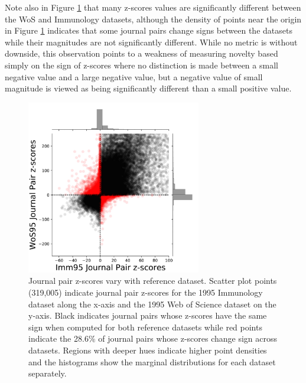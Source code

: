 \documentclass[NETN]{stjour}
\begin{document}
Note also in Figure \ref{fig:scatter} that many z-scores values are significantly different between the WoS and Immunology datasets, although the density of points near the origin in Figure \ref{fig:scatter} indicates that some journal pairs change signs between the datasets while their magnitudes are not significantly different. While no metric is without downside, this observation points to a weakness of measuring novelty based simply on the sign of z-scores where no distinction is made between a small negative value and a large negative value, but a negative value of small magnitude is viewed as being significantly different than a small positive value.


\begin{figure}%
\centering
\includegraphics[width=3in]{fig2_scatter_z_scores_flattened.pdf}     %
\caption{Journal pair z-scores vary with reference dataset. Scatter plot points (319,005) indicate journal pair z-scores for the 1995 Immunology dataset along the x-axis and the 1995 Web of Science dataset on the y-axis. Black indicates journal pairs whose z-scores have the same sign when computed for both reference datasets while red points indicate the 28.6\% of journal pairs whose z-scores change sign across datasets. Regions with deeper hues indicate higher point densities and the histograms show the marginal distributions for each dataset separately.}
\label{fig:scatter}
\end{figure}

\end{document}
